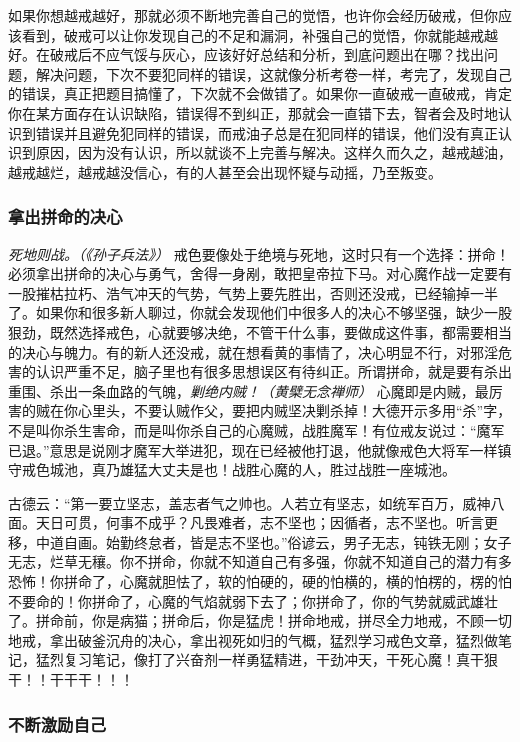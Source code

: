 如果你想越戒越好，那就必须不断地完善自己的觉悟，也许你会经历破戒，但你应该看到，破戒可以让你发现自己的不足和漏洞，补强自己的觉悟，你就能越戒越好。在破戒后不应气馁与灰心，应该好好总结和分析，到底问题出在哪？找出问题，解决问题，下次不要犯同样的错误，这就像分析考卷一样，考完了，发现自己的错误，真正把题目搞懂了，下次就不会做错了。如果你一直破戒一直破戒，肯定你在某方面存在认识缺陷，错误得不到纠正，那就会一直错下去，智者会及时地认识到错误并且避免犯同样的错误，而戒油子总是在犯同样的错误，他们没有真正认识到原因，因为没有认识，所以就谈不上完善与解决。这样久而久之，越戒越油，越戒越烂，越戒越没信心，有的人甚至会出现怀疑与动摇，乃至叛变。

\subsubsection{拿出拼命的决心}

\textit{死地则战。（《孙子兵法》）} 戒色要像处于绝境与死地，这时只有一个选择：拼命！必须拿出拼命的决心与勇气，舍得一身剐，敢把皇帝拉下马。对心魔作战一定要有一股摧枯拉朽、浩气冲天的气势，气势上要先胜出，否则还没戒，已经输掉一半了。如果你和很多新人聊过，你就会发现他们中很多人的决心不够坚强，缺少一股狠劲，既然选择戒色，心就要够决绝，不管干什么事，要做成这件事，都需要相当的决心与魄力。有的新人还没戒，就在想看黄的事情了，决心明显不行，对邪淫危害的认识严重不足，脑子里也有很多思想误区有待纠正。所谓拼命，就是要有杀出重围、杀出一条血路的气魄，\textit{剿绝内贼！（黄檗无念禅师）} 心魔即是内贼，最厉害的贼在你心里头，不要认贼作父，要把内贼坚决剿杀掉！大德开示多用“杀”字，不是叫你杀生害命，而是叫你杀自己的心魔贼，战胜魔军！有位戒友说过：“魔军已退。”意思是说刚才魔军大举进犯，现在已经被他打退，他就像戒色大将军一样镇守戒色城池，真乃雄猛大丈夫是也！战胜心魔的人，胜过战胜一座城池。

古德云：“第一要立坚志，盖志者气之帅也。人若立有坚志，如统军百万，威神八面。天日可贯，何事不成乎？凡畏难者，志不坚也；因循者，志不坚也。听言更移，中道自画。始勤终怠者，皆是志不坚也。”俗谚云，男子无志，钝铁无刚；女子无志，烂草无穰。你不拼命，你就不知道自己有多强，你就不知道自己的潜力有多恐怖！你拼命了，心魔就胆怯了，软的怕硬的，硬的怕横的，横的怕楞的，楞的怕不要命的！你拼命了，心魔的气焰就弱下去了；你拼命了，你的气势就威武雄壮了。拼命前，你是病猫；拼命后，你是猛虎！拼命地戒，拼尽全力地戒，不顾一切地戒，拿出破釜沉舟的决心，拿出视死如归的气概，猛烈学习戒色文章，猛烈做笔记，猛烈复习笔记，像打了兴奋剂一样勇猛精进，干劲冲天，干死心魔！真干狠干！！干干干！！！

\subsubsection{不断激励自己}

